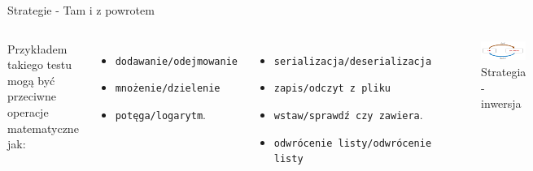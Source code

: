 \begin{frame}{Strategie - Tam i z powrotem}
    \begin{columns}[t]
            Przykładem takiego testu mogą być przeciwne operacje matematyczne jak:
            \begin{itemize}[<+->]
                \item \texttt{dodawanie/odejmowanie}
                \item \texttt{mnożenie/dzielenie}
                \item \texttt{potęga/logarytm}.
            \end{itemize} 
            \begin{itemize}[<+->]
                \item \texttt{serializacja/deserializacja}
                \item \texttt{zapis/odczyt z pliku}
                \item \texttt{wstaw/sprawdź czy zawiera}.
                \item \texttt{odwrócenie listy/odwrócenie listy}
            \end{itemize} 
        \centering
        \begin{figure}
            \centering
            \includegraphics[width=1\textwidth]{images/property_inverse.png}
            \caption{Strategia - inwersja}
            \label{fig:inverse_strategy}
        \end{figure}    
    \end{columns}
\end{frame}


